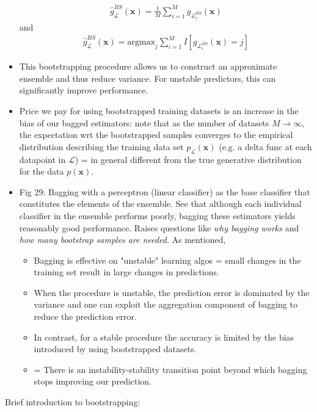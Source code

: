 \documentclass[norsk,a4paper,11pt]{article}
\begin{document}
\begin{itemize}
	\begin{align}
		\hat{g}_\mathcal{L}^{BS} (\bm{x}) = \frac{1}{M} \sum_{i=1}^M g_{\mathcal{L}_i^{BS}} (\bm{x})
	\end{align}
	and
	\begin{align}
		\hat{g}_\mathcal{L}^{BS} (\bm{x}) = \text{argmax}_j \sum_{i=1}^M I [g_{\mathcal{L}_i^{BS}} (\bm{x}) = j]
	\end{align}
	\item This bootstrapping procedure allows us to construct an approximate ensemble and thus reduce variance. For unstable predictors, this can significantly improve performance. 
	\item Price we pay for using bootstrapped training datasets is an increase in the bias of our bagged estimators: note that as the number of datasets $M \rightarrow \infty$, the expectation wrt the bootstrapped samples converges to the empirical distribution describing the training data set $p_\mathcal{L}(\bm{x})$ (e.g. a delta func at each datapoint in $\mathcal{L}$) = in general different from the true generative distribution for the data $p(\bm{x})$.
	\item Fig 29: Bagging with a perceptron (linear classifier) as the base classifier that constitutes the elements of the ensemble. See that although each individual classifier in the ensemble performs poorly, bagging these estimators yields reasonably good performance. Raises questions like \textit{why bagging works} and \textit{how many bootstrap samples are needed}. As mentioned,
	\begin{itemize}
		\item Bagging is effective on "unstable" learning algos = small changes in the training set result in large changes in predictions.
		\item When the procedure is unstable, the prediction error is dominated by the variance and one can exploit the aggregation component of bagging to reduce the prediction error.
		\item In contrast, for a stable procedure the accuracy is limited by the bias introduced by using bootstrapped datasets.
		\item = There is an instability-stability transition point beyond which bagging stops improving our prediction.
	\end{itemize}
\end{itemize}
Brief introduction to bootstrapping:
\end{document}
